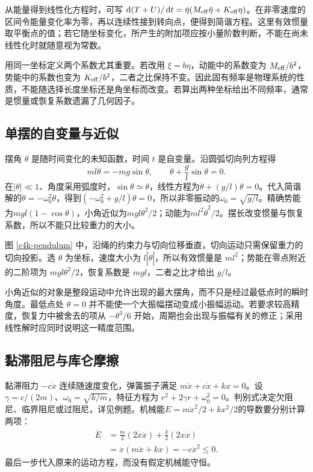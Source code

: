 从能量得到线性化方程时，可写
$\mathop{}\!\mathrm d(T+U)/\mathop{}\!\mathrm d t=\dot\eta(M_{\rm eff}\ddot\eta+K_{\rm eff}\eta)$。在非零速度的区间令能量变化率为零，再以连续性接到转向点，便得到简谐方程。这里有效惯量取平衡点的值；若它随坐标变化，所产生的附加项应按小量阶数判断，不能在尚未线性化时就随意视为常数。

用同一坐标定义两个系数尤其重要。若改用 $\xi=b\eta$，动能中的系数变为 $M_{\rm eff}/b^2$，势能中的系数也变为 $K_{\rm eff}/b^2$，二者之比保持不变。因此固有频率是物理系统的性质，不能随选择长度坐标还是角坐标而改变。若算出两种坐标给出不同频率，通常是惯量或恢复系数遗漏了几何因子。

\subsection{单摆的自变量与近似}
摆角 $\theta$ 是随时间变化的未知函数，时间 $t$ 是自变量。沿圆弧切向列方程得
\[
 ml\ddot\theta=-mg\sin\theta,\qquad
 \ddot\theta+\frac gl\sin\theta=0.
\]
在$|\theta|\ll1$、角度采用弧度时，$\sin\theta\simeq\theta$，线性方程为$\ddot\theta+(g/l)\theta=0$。代入简谐解的$\ddot\theta=-\omega_0^2\theta$，得到$(-\omega_0^2+g/l)\theta=0$，所以非零振动的$\omega_0=\sqrt{g/l}$。精确势能为$mgl(1-\cos\theta)$，小角近似为$mgl\theta^2/2$；动能为$ml^2\dot\theta^2/2$。摆长改变惯量与恢复系数，所以不能只比较重力的大小。

图 \ref{c4k-pendulum} 中，沿绳的约束力与切向位移垂直，切向运动只需保留重力的切向投影。选 $\theta$ 为坐标，速度大小为 $l|\dot\theta|$，所以有效惯量是 $ml^2$；势能在零点附近的二阶项为 $mgl\theta^2/2$，恢复系数是 $mgl$，二者之比才给出 $g/l$。

小角近似的对象是整段运动中允许出现的最大摆角，而不只是经过最低点时的瞬时角度。最低点处 $\theta=0$ 并不能使一个大振幅摆动变成小振幅运动。若要求较高精度，恢复力中被舍去的项从 $-\theta^3/6$ 开始，周期也会出现与振幅有关的修正；采用线性解时应同时说明这一精度范围。

\subsection{黏滞阻尼与库仑摩擦}
黏滞阻力 $-c\dot x$ 连续随速度变化，弹簧振子满足
$m\ddot x+c\dot x+kx=0$。设 $\gamma=c/(2m)$、$\omega_0=\sqrt{k/m}$，特征方程为
$r^2+2\gamma r+\omega_0^2=0$。判别式决定欠阻尼、临界阻尼或过阻尼，详见例题。机械能$E=m\dot x^2/2+kx^2/2$的导数要分别计算两项：
\begin{align*}
\dot E&=\frac m2(2\dot x\ddot x)+\frac k2(2x\dot x)\\
&=\dot x(m\ddot x+kx)=-c\dot x^2\le0.
\end{align*}
最后一步代入原来的运动方程，而没有假定机械能守恒。

